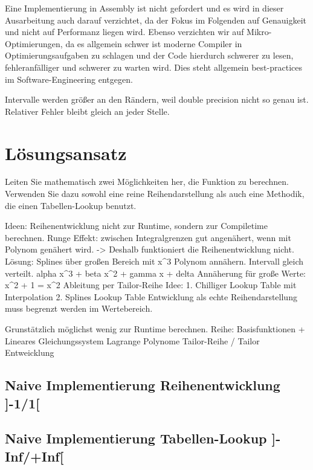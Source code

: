 \documentclass[course=erap]{aspdoc}
\begin{document}
    Eine Implementierung in Assembly ist nicht gefordert und es wird in dieser Ausarbeitung auch darauf verzichtet, da der Fokus im Folgenden auf Genauigkeit und nicht auf Performanz liegen wird.
    Ebenso verzichten wir auf Mikro-Optimierungen, da es allgemein schwer ist moderne Compiler in Optimierungsaufgaben zu schlagen und der Code hierdurch schwerer zu lesen, fehleranfälliger und schwerer zu warten wird.
    Dies steht allgemein best-practices im Software-Engineering entgegen.

    Intervalle werden größer an den Rändern, weil double precision nicht so genau ist.
    Relativer Fehler bleibt gleich an jeder Stelle.


    \section{Lösungsansatz}

    Leiten Sie mathematisch zwei Möglichkeiten her, die Funktion zu berechnen.
    Verwenden Sie dazu sowohl eine reine Reihendarstellung als auch eine Methodik, die einen Tabellen-Lookup benutzt.

    Ideen: Reihenentwicklung nicht zur Runtime, sondern zur Compiletime berechnen.
    Runge Effekt: zwischen Integralgrenzen gut angenähert, wenn mit Polynom genähert wird. -> Deshalb funktioniert die Reihenentwicklung nicht.
    Lösung: Splines über großen Bereich mit x^3 Polynom annähern. Intervall gleich verteilt. alpha x^3 + beta x^2 + gamma x + delta
    Annäherung für große Werte: x^2 + 1 = x^2
    Ableitung per Tailor-Reihe
    Idee: 1. Chilliger Lookup Table mit Interpolation 2. Splines Lookup Table
    Entwicklung als echte Reihendarstellung muss begrenzt werden im Wertebereich.

    Grunstätzlich möglichst wenig zur Runtime berechnen.
    Reihe: Basisfunktionen + Lineares Gleichungssystem
    Lagrange Polynome
    Tailor-Reihe / Tailor Entweicklung

    \subsection{Naive Implementierung Reihenentwicklung ]-1/1[}

    \subsection{Naive Implementierung Tabellen-Lookup ]-Inf/+Inf[}
\end{document}
